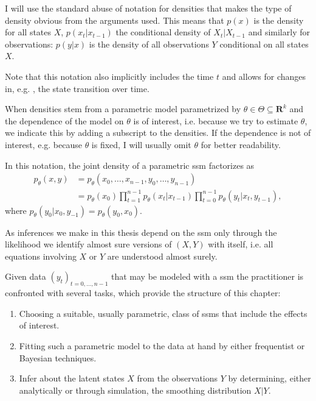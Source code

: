 \begin{notation}
    \label{not:densities}
    I will use the standard abuse of notation for densities that makes the type of density \glqq{}obvious\grqq{} from the arguments used.
    This means that $p(x)$ is the density for all states $X$, $p(x_t|x_{t - 1})$ the conditional density of $X_t|X_{t - 1}$ and similarly for observations: $p(y|x)$ is the density of all observations $Y$ conditional on all states $X$.

    Note that this notation also implicitly includes the time $t$ and allows for changes in, e.g. , the state transition over time.

    When densities stem from a parametric model parametrized by $\theta \in \Theta \subseteq \mathbf{R}^{k}$ and the dependence of the model on $\theta$ is of interest, i.e. because we try to estimate $\theta$, we indicate this by adding a subscript to the densities.
    If the dependence is not of interest, e.g. because $\theta$ is fixed, I will usually omit $\theta$ for better readability.

    In this notation, the joint density of a parametric \gls{ssm} factorizes as
    \begin{align*}
        p_\theta(x,y) & = p_\theta(x_0, \dots, x_{n - 1}, y_0, \dots, y_{n - 1})                                                              \\
                      & = p_\theta (x_0)\prod_{t = 1}^{n - 1} p_\theta(x_{t}|x_{t - 1}) \prod_{t = 0}^{n - 1} p_\theta(y_t | x_t, y_{t - 1}),
    \end{align*}
    where $p_\theta(y_0|x_0, y_{-1}) = p_\theta(y_0, x_0)$.

    As inferences we make in this thesis depend on the \gls{ssm} only through the likelihood we identify almost sure versions of $(X, Y)$ with itself, i.e. all equations involving $X$ or $Y$ are understood almost surely.
\end{notation}

Given data $(y_t)_{t = 0, \dots, n - 1}$ that may be modeled with a \gls{ssm} the practitioner is confronted with several tasks, which provide the structure of this chapter:

\begin{enumerate}
    \item\label{it:model_choice} Choosing a suitable, usually parametric, class of \glspl{ssm} that include the effects of interest.
    \item\label{it:model_fitting} Fitting such a parametric model to the data at hand by either frequentist or Bayesian techniques.
    \item\label{it:smoothing_problem} Infer about the latent states $X$ from the observations $Y$ by determining, either analytically or through simulation, the smoothing distribution $X|Y$.
\end{enumerate}

